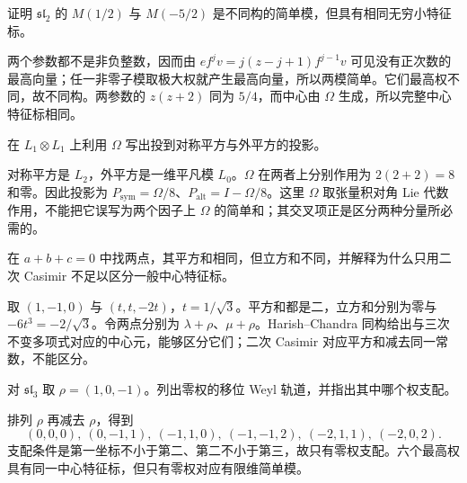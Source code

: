\begin{optionalexercise}\label{b5:ex:20-same-character}
	证明 \(\mathfrak{sl}_2\) 的 \(M(1/2)\) 与 \(M(-5/2)\) 是不同构的简单模，但具有相同无穷小特征标。
\end{optionalexercise}
\begin{solution}
	两个参数都不是非负整数，因而由 \(ef^jv=j(z-j+1)f^{j-1}v\) 可见没有正次数的最高向量；任一非零子模取极大权就产生最高向量，所以两模简单。它们最高权不同，故不同构。两参数的 \(z(z+2)\) 同为 \(5/4\)，而中心由 \(\Omega\) 生成，所以完整中心特征标相同。
\end{solution}

\begin{optionalexercise}\label{b5:ex:20-casimir-projectors}
	在 \(L_1\otimes L_1\) 上利用 \(\Omega\) 写出投到对称平方与外平方的投影。
\end{optionalexercise}
\begin{solution}
	对称平方是 \(L_2\)，外平方是一维平凡模 \(L_0\)。\(\Omega\) 在两者上分别作用为 \(2(2+2)=8\) 和零。因此投影为 \(P_{\mathrm{sym}}=\Omega/8\)、\(P_{\mathrm{alt}}=I-\Omega/8\)。这里 \(\Omega\) 取张量积对角 Lie 代数作用，不能把它误写为两个因子上 \(\Omega\) 的简单和；其交叉项正是区分两种分量所必需的。
\end{solution}

\begin{optionalexercise}\label{b5:ex:20-sl3-cubic-center}
	在 \(a+b+c=0\) 中找两点，其平方和相同，但立方和不同，并解释为什么只用二次 Casimir 不足以区分一般中心特征标。
\end{optionalexercise}
\begin{solution}
	取 \((1,-1,0)\) 与 \((t,t,-2t)\)，\(t=1/\sqrt3\)。平方和都是二，立方和分别为零与 \(-6t^3=-2/\sqrt3\)。令两点分别为 \(\lambda+\rho\)、\(\mu+\rho\)。Harish--Chandra 同构给出与三次不变多项式对应的中心元，能够区分它们；二次 Casimir 对应平方和减去同一常数，不能区分。
\end{solution}

\begin{optionalexercise}\label{b5:ex:20-dot-orbit}
	对 \(\mathfrak{sl}_3\) 取 \(\rho=(1,0,-1)\)。列出零权的移位 Weyl 轨道，并指出其中哪个权支配。
\end{optionalexercise}
\begin{solution}
	排列 \(\rho\) 再减去 \(\rho\)，得到
	\[
		(0,0,0),\ (0,-1,1),\ (-1,1,0),\ (-1,-1,2),\ (-2,1,1),\ (-2,0,2).
	\]
	支配条件是第一坐标不小于第二、第二不小于第三，故只有零权支配。六个最高权具有同一中心特征标，但只有零权对应有限维简单模。
\end{solution}

